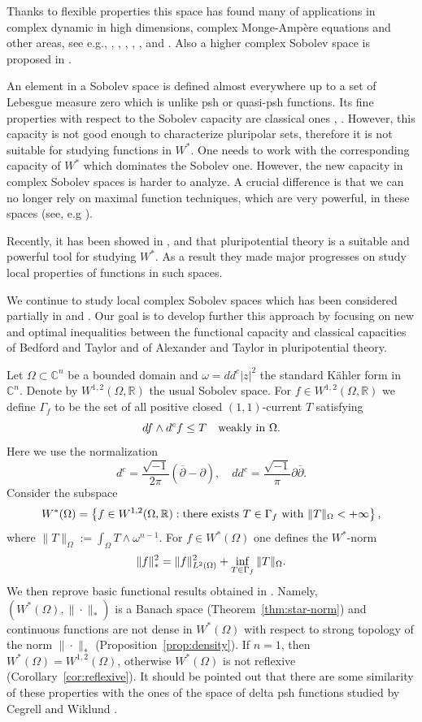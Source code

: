 \documentclass{amsart}
\renewcommand{\d}{\partial}
\newcommand{\dbar}{\overline{\d}}
\newcommand{\ii}{\sqrt{-1}}
\newcommand{\om}{\omega}
\newcommand{\Ga}{\Gamma}
\newcommand{\Om}{\Omega}
\newcommand{\bR}{\mathbb{R}}
\newcommand{\bC}{\mathbb{C}}
\theoremstyle{definition}
\numberwithin{thm}{section}
\numberwithin{equation}{section}
\renewcommand{\[}{\begin{equation}}
\renewcommand{\]}{\end{equation}}
\newcommand{\wed}{\wedge}
\begin{document}
Thanks to flexible properties this space has found many of applications in complex dynamic in high dimensions, complex Monge-Amp\`ere equations and other areas, see e.g., \cite{BiD23}, \cite{DKN}, \cite{DKW}, \cite{DNV25}, \cite{Vig15}, \cite{Vu20, Vu24, Vu26} and \cite{WZ}. Also a higher complex Sobolev space is proposed in \cite{DoN25}. 

An element in a Sobolev space is defined almost everywhere up to a set of Lebesgue measure zero which is unlike psh or quasi-psh functions. Its fine properties with respect to the Sobolev capacity are classical ones \cite{EG92}, \cite{KLV-book}. However, this capacity is not good enough to characterize pluripolar sets, therefore it is not suitable for studying functions in $W^*$. One needs to work with the corresponding capacity of $W^*$ which dominates the Sobolev one. However, the new capacity in complex Sobolev spaces is harder to analyze. A crucial difference is that we can no longer rely on maximal function techniques, which are very powerful, in these spaces (see, e.g \cite{KLV-book}). 

Recently, it has been showed in \cite{DMV}, \cite{Vigny} and \cite{VV24} that pluripotential theory is a suitable and powerful tool for studying $W^*$. As a result they made major  progresses on study local properties of functions in such spaces.  

We continue to study local complex Sobolev spaces which has been considered partially in \cite{DMV} and  \cite{Vigny}. Our goal is to develop further this approach by focusing on new and optimal inequalities between the functional capacity and classical capacities of Bedford and Taylor \cite{BT82} and of Alexander and Taylor \cite{AT84} in pluripotential theory.

Let $\Om \subset \bC^n$ be a bounded domain  and $\om = dd^c |z|^2$  the standard K\"ahler form in $\bC^n$.  Denote by $W^{1,2}(\Om, \bR)$ the usual Sobolev space. For  $f\in W^{1,2}(\Om, \bR)$ we define $\Ga_f$  to be the set of all positive closed $(1,1)$-current $T$ satisfying
\[\label{eq:test-currents}\notag
	df \wed d^c f \leq T \quad\text{weakly in } \Om.
\]
Here we use the normalization 
$$d^c = \frac{\ii}{2\pi} (\dbar -\d), \quad dd^c = \frac{\ii}{\pi}\d\dbar.
$$
Consider the subspace
\[ \label{eq:sobolev-space} \notag
W^*(\Om)= \left\{f \in W^{1,2}(\Om,\bR):   \text{there exists $T\in \Ga_f$ with } \|T\|_\Om <+\infty
\right\},
\]
where 
$
	 \|T \|_\Om := \int_\Om T \wed \om^{n-1}.
$
For $f \in W^*(\Om)$ one defines the $W^*$-norm
\[\label{eq:norm} \notag
	\|f\|_*^2 = \| f\|_{L^2(\Om)}^2 + \inf_{T\in \Ga_f} \|T\|_{\Om}.
\]
We then reprove basic functional results obtained in \cite{Vigny}. Namely, $(W^*(\Om), \|\cdot\|_*)$ is a Banach space (Theorem~\ref{thm:star-norm}) and  continuous functions are not dense in $W^*(\Om)$ with respect to strong topology of the norm $\|\cdot\|_*$ (Proposition~\ref{prop:density}). If $n=1$, then  $W^*(\Om) = W^{1,2}(\Om)$, otherwise $W^*(\Om)$ is not reflexive (Corollary~\ref{cor:reflexive}). It should be pointed out that there are some similarity of these properties with the ones of the space of delta psh functions studied by Cegrell and Wiklund \cite{CW05}.
 
\end{document}
